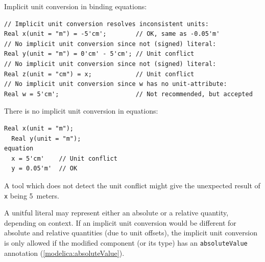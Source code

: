 \begin{example}
Implicit unit conversion in binding equations:
\begin{lstlisting}[language=modelica]
// Implicit unit conversion resolves inconsistent units:
Real x(unit = "m") = -5'cm';        // OK, same as -0.05'm'
// No implicit unit conversion since not (signed) literal:
Real y(unit = "m") = 0'cm' - 5'cm'; // Unit conflict
// No implicit unit conversion since not (signed) literal:
Real z(unit = "cm") = x;            // Unit conflict
// No implicit unit conversion since w has no unit-attribute:
Real w = 5'cm';                     // Not recommended, but accepted
\end{lstlisting}

There is no implicit unit conversion in equations:
\begin{lstlisting}[language=modelica]
  Real x(unit = "m");
  Real y(unit = "m");
equation
  x = 5'cm'    // Unit conflict
  y = 0.05'm'  // OK
\end{lstlisting}
A tool which does not detect the unit conflict might give the unexpected result of \lstinline!x! being 5~meters.
\end{example}

A unitful literal may represent either an absolute or a relative quantity, depending on context.
If an implicit unit conversion would be different for absolute and relative quantities (due to unit offsets), the implicit unit conversion is only allowed if the modified component (or its type) has an \lstinline!absoluteValue! annotation (\cref{modelica:absoluteValue}).

